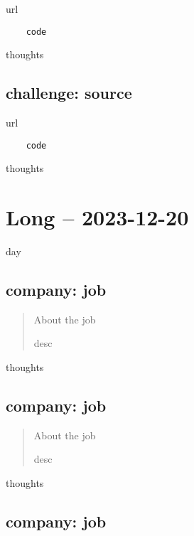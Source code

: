 \documentclass[
	letterpaper, %
	12pt, %
]{CSSullivanBusinessReport}
\begin{document}
url

\begin{verbatim}
	code
\end{verbatim}

thoughts


\subsection[Challenge]{challenge: source}

url

\begin{verbatim}
	code
\end{verbatim}

thoughts


\section[20 Dec: Short]{Long -- 2023-12-20} %

day


\subsection[company]{company: job}

\begin{quote}
	About the job
	
	desc

\end{quote}

thoughts


\subsection[company]{company: job}

\begin{quote}
	About the job
	
	desc

\end{quote}

thoughts


\subsection[company]{company: job}
\end{document}

